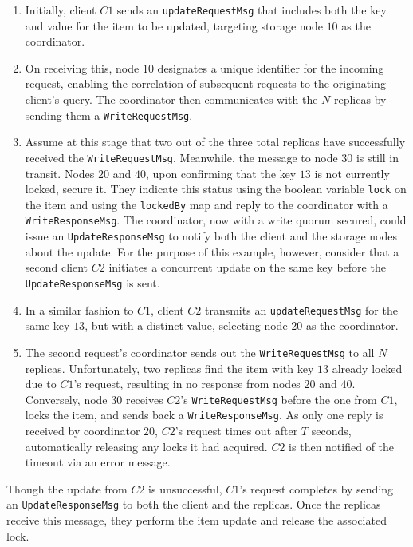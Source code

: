 \documentclass[a4paper, 11pt]{article}
\begin{document}
\begin{enumerate}
    \item Initially, client $C1$ sends an \verb|updateRequestMsg| that includes both the key and value for the item to be updated, targeting storage node $10$ as the coordinator.
    \item On receiving this, node $10$ designates a unique identifier for the incoming request, enabling the correlation of subsequent requests to the originating client's query. The coordinator then communicates with the $N$ replicas by sending them a \verb|WriteRequestMsg|.
    \item Assume at this stage that two out of the three total replicas have successfully received the \verb|WriteRequestMsg|. Meanwhile, the message to node $30$ is still in transit. Nodes $20$ and $40$, upon confirming that the key $13$ is not currently locked, secure it. They indicate this status using the boolean variable \verb|lock| on the item and using the \verb|lockedBy| map and reply to the coordinator with a \verb|WriteResponseMsg|. The coordinator, now with a write quorum secured, could issue an \verb|UpdateResponseMsg| to notify both the client and the storage nodes about the update. For the purpose of this example, however, consider that a second client $C2$ initiates a concurrent update on the same key before the \verb|UpdateResponseMsg| is sent.
    \item In a similar fashion to $C1$, client $C2$ transmits an \verb|updateRequestMsg| for the same key $13$, but with a distinct value, selecting node $20$ as the coordinator.
    \item The second request's coordinator sends out the \verb|WriteRequestMsg| to all $N$ replicas. Unfortunately, two replicas find the item with key $13$ already locked due to $C1$'s request, resulting in no response from nodes $20$ and $40$. Conversely, node $30$ receives $C2$'s \verb|WriteRequestMsg| before the one from $C1$, locks the item, and sends back a \verb|WriteResponseMsg|. As only one reply is received by coordinator $20$, $C2$'s request times out after $T$ seconds, automatically releasing any locks it had acquired. $C2$ is then notified of the timeout via an error message.
\end{enumerate}

Though the update from $C2$ is unsuccessful, $C1$'s request completes by sending an \verb|UpdateResponseMsg| to both the client and the replicas. Once the replicas receive this message, they perform the item update and release the associated lock.
\end{document}
